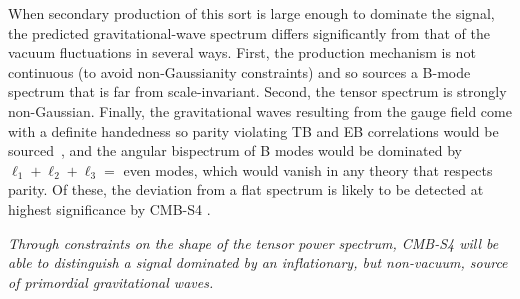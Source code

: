 When secondary production of this sort is large enough to dominate the signal, the predicted gravitational-wave spectrum differs significantly from that of the vacuum fluctuations in several ways. First, the production mechanism is not continuous (to avoid non-Gaussianity constraints) and so sources a B-mode spectrum that is far from scale-invariant. Second, the tensor spectrum is strongly non-Gaussian. Finally, the gravitational waves resulting from the gauge field come with a definite handedness \cite{Anber:2006xt,Sorbo:2011rz} so parity violating TB and EB correlations would be sourced~\cite{Contaldi:2008yz}, and the angular bispectrum of B modes would be dominated by $\ell_1+\ell_2+\ell_3=$ even modes, which would vanish in any theory that respects parity. Of these, the deviation from a flat spectrum is likely to be detected at highest significance by CMB-S4 \cite{Namba:2015gja,Peloso:2016gqs}. 

{\it Through constraints on the shape of the tensor power spectrum, CMB-S4 will be able to distinguish a signal dominated by an inflationary, but non-vacuum, source of primordial gravitational waves.}


